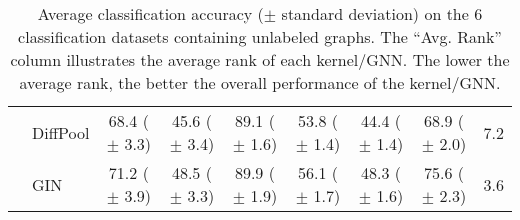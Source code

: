 \documentclass[twoside,11pt]{article}
\begin{document}
\begin{table}[t]
{\begin{tabular}{llccccccc}
& DiffPool & 68.4 {\tiny ($\pm$ 3.3)} & 45.6 {\tiny ($\pm$ 3.4)} & 89.1 {\tiny ($\pm$ 1.6)} & 53.8 {\tiny ($\pm$ 1.4)} & 44.4 {\tiny ($\pm$ 1.4)} & 68.9 {\tiny ($\pm$ 2.0)} & 7.2 \\ 
& GIN & 71.2 {\tiny ($\pm$ 3.9)} & 48.5 {\tiny ($\pm$ 3.3)} & 89.9 {\tiny ($\pm$ 1.9)} & 56.1 {\tiny ($\pm$ 1.7)} & 48.3 {\tiny ($\pm$ 1.6)} & 75.6 {\tiny ($\pm$ 2.3)} & 3.6 \\ 
\bottomrule
\end{tabular}
}
\caption{Average classification accuracy ($\pm$ standard deviation) on the $6$ classification datasets containing unlabeled graphs. The ``Avg. Rank'' column illustrates the average rank of each kernel/GNN. The lower the average rank, the better the overall performance of the kernel/GNN.}
\label{tab:results_unlabeled}
\end{table}
\end{document}
